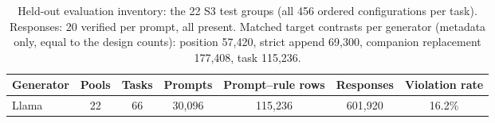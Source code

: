 \begin{table}[t]
\centering\footnotesize
\caption{Held-out evaluation inventory: the 22 S3 test groups (all 456 ordered configurations per task). Responses: 20 verified per prompt, all present. Matched target contrasts per generator (metadata only, equal to the design counts): position 57,420, strict append 69,300, companion replacement 177,408, task 115,236.}
\label{tab:inventory}
\begin{tabular}{lcccccc}
\toprule
Generator & Pools & Tasks & Prompts & Prompt--rule rows & Responses & Violation rate \\
\midrule
Llama & 22 & 66 & 30,096 & 115,236 & 601,920 & 16.2\% \\
\bottomrule
\end{tabular}
\end{table}

